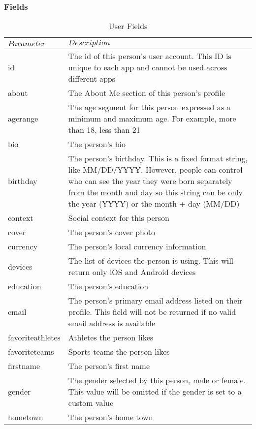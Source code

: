 \documentclass{article}
\begin{document}
	\subsubsection{Fields}
		\begin{table}[H]
		\centering
		\caption{User Fields}
		\label{my-label}
		\begin{tabularx}{\textwidth}{|l|X|}
		\hline
		$Parameter$ & $Description$ 	\\ \hline
		id 				& The id of this person's user account. This ID is unique to each app and cannot be used across different apps \\ \hline
		about 			& The About Me section of this person's profile \\ \hline
		age\textunderscore range 		& The age segment for this person expressed as a minimum and maximum age. For example, more than 18, less than 21 \\   \hline
		bio 		& The person's bio \\   \hline
		birthday 		& The person's birthday. This is a fixed format string, like MM/DD/YYYY. However, people can control who can see the year they were born separately from the month and day so this string can be only the year (YYYY) or the month + day (MM/DD) \\   \hline
		context 		& Social context for this person \\   \hline
		cover 		& The person's cover photo \\   \hline
		currency 		& The person's local currency information \\   \hline
		devices 			& The list of devices the person is using. This will return only iOS and Android devices \\ \hline
		education 			& The person's education \\ \hline
		email 			& The person's primary email address listed on their profile. This field will not be returned if no valid email address is available \\ \hline
		favorite\textunderscore athletes 		& Athletes the person likes	\\ \hline
		favorite\textunderscore teams 		& Sports teams the person likes	\\ \hline
		first\textunderscore name 		& The person's first name	\\ \hline
		gender 			& The gender selected by this person, male or female. This value will be omitted if the gender is set to a custom value
 \\ \hline
		hometown 			& The person's home town \\ \hline

\end{tabularx}
\end{table}
\end{document}
